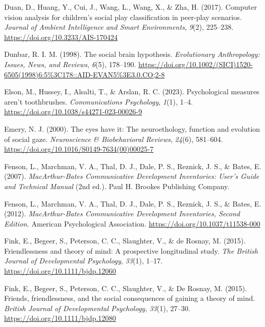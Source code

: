 \documentclass[
]{scrbook}
\newlength{\cslhangindent}
\newenvironment{CSLReferences}[2] %
 {\begin{list}{}{%
  \setlength{\itemindent}{0pt}
  \setlength{\leftmargin}{0pt}
  \setlength{\parsep}{0pt}
  \ifodd #1
   \setlength{\leftmargin}{\cslhangindent}
   \setlength{\itemindent}{-1\cslhangindent}
  \fi
  \setlength{\itemsep}{#2\baselineskip}}}
 {\end{list}}
\begin{document}
\begin{CSLReferences}{1}{0}
Duan, D., Huang, Y., Cui, J., Wang, L., Wang, X., \& Zha, H. (2017). Computer vision analysis for children's social play classification in peer-play scenarios. \emph{Journal of Ambient Intelligence and Smart Environments}, \emph{9}(2), 225--238. \url{https://doi.org/10.3233/AIS-170424}

Dunbar, R. I. M. (1998). The social brain hypothesis. \emph{Evolutionary Anthropology: Issues, News, and Reviews}, \emph{6}(5), 178--190. \url{https://doi.org/10.1002/(SICI)1520-6505(1998)6:5\%3C178::AID-EVAN5\%3E3.0.CO;2-8}

Elson, M., Hussey, I., Alsalti, T., \& Arslan, R. C. (2023). Psychological measures aren't toothbrushes. \emph{Communications Psychology}, \emph{1}(1), 1--4. \url{https://doi.org/10.1038/s44271-023-00026-9}

Emery, N. J. (2000). The eyes have it: The neuroethology, function and evolution of social gaze. \emph{Neuroscience \& Biobehavioral Reviews}, \emph{24}(6), 581--604. \url{https://doi.org/10.1016/S0149-7634(00)00025-7}

Fenson, L., Marchman, V. A., Thal, D. J., Dale, P. S., Reznick, J. S., \& Bates, E. (2007). \emph{{MacArthur-Bates Communicative Development Inventories}: {User}'s {Guide} and {Technical Manual}} (2nd ed.). Paul H. Brookes Publishing Company.

Fenson, L., Marchman, V. A., Thal, D. J., Dale, P. S., Reznick, J. S., \& Bates, E. (2012). \emph{{MacArthur-Bates Communicative Development Inventories}, {Second Edition}}. American Psychological Association. \url{https://doi.org/10.1037/t11538-000}

Fink, E., Begeer, S., Peterson, C. C., Slaughter, V., \& de Rosnay, M. (2015). Friendlessness and theory of mind: A prospective longitudinal study. \emph{The British Journal of Developmental Psychology}, \emph{33}(1), 1--17. \url{https://doi.org/10.1111/bjdp.12060}

Fink, E., Begeer, S., Peterson, C. C., Slaughter, V., \& De Rosnay, M. (2015). Friends, friendlessness, and the social consequences of gaining a theory of mind. \emph{British Journal of Developmental Psychology}, \emph{33}(1), 27--30. \url{https://doi.org/10.1111/bjdp.12080}


\end{CSLReferences}
\end{document}
